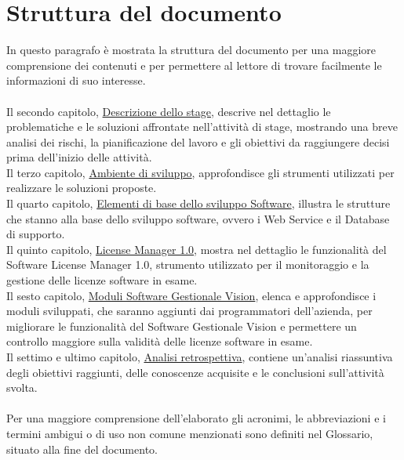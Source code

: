 \section{Struttura del documento}

In questo paragrafo è mostrata la struttura del documento per una maggiore comprensione dei contenuti e per permettere al lettore di trovare facilmente le informazioni di suo interesse.
\\
\\
Il secondo capitolo, {\hyperref[cap:descrizione-stage]{Descrizione dello stage}}, descrive nel dettaglio le problematiche e le soluzioni affrontate nell'attività di stage, mostrando una breve analisi dei rischi, la pianificazione del lavoro e gli obiettivi da raggiungere decisi prima dell'inizio delle attività.
\\
Il terzo capitolo, {\hyperref[cap:ambiente-sviluppo]{Ambiente di sviluppo}}, approfondisce gli strumenti utilizzati per realizzare le soluzioni proposte.
\\ 
Il quarto capitolo, {\hyperref[cap:sviluppo-software]{Elementi di base dello sviluppo Software}}, illustra le strutture che stanno alla base dello sviluppo software, ovvero i Web Service e il Database di supporto.
\\ 
Il quinto capitolo, {\hyperref[cap:license-manager]{License Manager 1.0}}, mostra nel dettaglio le funzionalità del Software License Manager 1.0, strumento utilizzato per il monitoraggio e la gestione delle licenze software in esame.
\\
Il sesto capitolo, {\hyperref[cap:moduli-vision]{Moduli Software Gestionale Vision}}, elenca e approfondisce i moduli sviluppati, che saranno aggiunti dai programmatori dell'azienda, per migliorare le funzionalità del Software Gestionale Vision e permettere un controllo maggiore sulla validità delle licenze software in esame.
\\  
Il settimo e ultimo capitolo, {\hyperref[cap:analisi-retrospettiva]{Analisi retrospettiva}}, contiene un'analisi riassuntiva degli obiettivi raggiunti, delle conoscenze acquisite e le conclusioni sull'attività svolta.
\\
\\
Per una maggiore comprensione dell'elaborato gli acronimi, le abbreviazioni e i termini ambigui o di uso non comune menzionati sono definiti nel Glossario, situato alla fine del documento.


